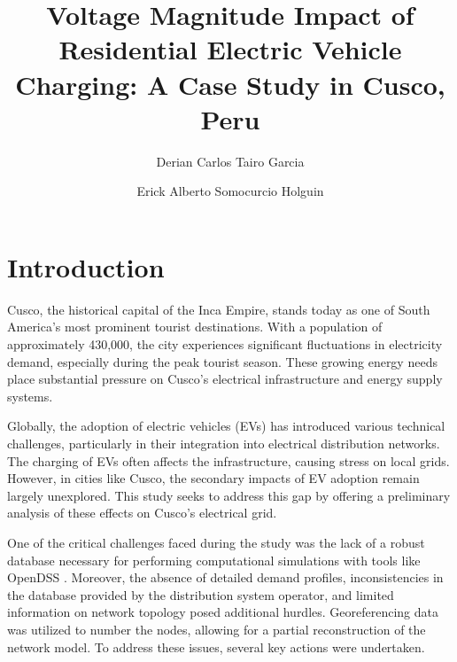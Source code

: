 \documentclass[12pt, 3p]{elsarticle}
\begin{document}
\title{Voltage Magnitude Impact of Residential Electric Vehicle Charging: 
A Case Study in Cusco, Peru}

\author[1]{Derian Carlos Tairo Garcia}
\author[1]{Erick Alberto Somocurcio Holguin} 



\begin{frontmatter}
    
\end{frontmatter}

\section{Introduction}\label{sec:introduction}

Cusco, the historical capital of the Inca Empire, stands today as 
one of South America's most prominent tourist destinations. With a 
population of approximately 430,000, the city experiences significant 
fluctuations in electricity demand, especially during the peak tourist 
season. These growing energy needs place substantial pressure 
on Cusco’s electrical infrastructure and energy supply systems.

Globally, the adoption of electric vehicles (EVs) has introduced 
various technical challenges, particularly in their integration into 
electrical distribution networks. The charging of EVs often affects 
the infrastructure, causing stress on local grids. However, in cities 
like Cusco, the secondary impacts of EV adoption remain largely 
unexplored. This study seeks to address this gap by offering a 
preliminary analysis of these effects on Cusco’s electrical grid.

One of the critical challenges faced during the study was the 
lack of a robust database necessary for performing computational 
simulations with tools like OpenDSS \cite{opendss}. 
Moreover, the absence of detailed 
demand profiles, inconsistencies in the database provided by the 
distribution system operator, and limited information on network 
topology posed additional hurdles. Georeferencing data was utilized 
to number the nodes, allowing for a partial reconstruction of the 
network model. To address these issues, several key actions were 
undertaken.
\end{document}
